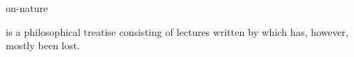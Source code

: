 \documentclass{stex}
\begin{document}
\begin{smodule}{on-nature}
\begin{sparagraph}[style=symdoc]
 is a philosophical treatise consisting of lectures written
by  which has, however, mostly been lost.
\end{sparagraph}
\end{smodule}
\end{document}
